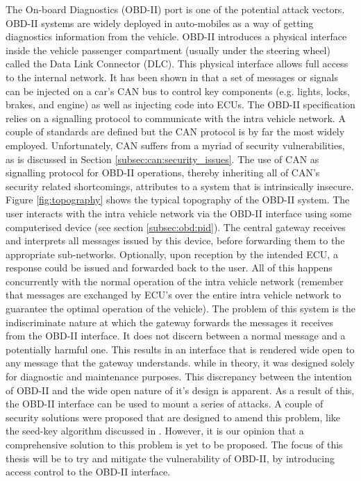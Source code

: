 The On-board Diagnostics (OBD-II) port is one of the potential attack vectors.  OBD-II systems are widely deployed in auto-mobiles as a way of getting diagnostics information from the vehicle. OBD-II introduces a physical interface inside the vehicle passenger compartment (usually under the steering wheel) called the Data Link Connector (DLC). This physical interface allows full access to the internal network. It has been shown in \cite{MillerA,Yadav16,MillerB,MillerC} that a set of messages or signals can be injected on a car's CAN bus to control key components (e.g. lights, locks, brakes, and engine) as well as injecting code into ECUs. The OBD-II specification relies on a signalling protocol to communicate with the intra vehicle network. A couple of standards are defined but the CAN protocol is by far the most widely employed. Unfortunately, CAN suffers from a myriad of security vulnerabilities, as is discussed in Section \ref{subsec:can:security_issues}. The use of CAN as signalling protocol for OBD-II operations, thereby inheriting all of CAN's security related shortcomings, attributes to a system that is intrinsically insecure. Figure \ref{fig:topography} shows the typical topography of the OBD-II system. The user interacts with the intra vehicle network via the OBD-II interface using some computerised device (see section \ref{subsec:obd:pid}). The central gateway receives and interprets all messages issued by this device, before forwarding them to the appropriate sub-networks. Optionally, upon reception by the intended ECU, a response could be issued and forwarded back to the user. All of this happens concurrently with the normal operation of the intra vehicle network (remember that messages are exchanged by ECU's over the entire intra vehicle network to guarantee the optimal operation of the vehicle). The problem of this system is the indiscriminate nature at which the gateway forwards the messages it receives from the OBD-II interface. It does not discern between a normal message and a potentially harmful one. This results in an interface that is rendered wide open to any message that the gateway understands. while in theory, it was designed solely for diagnostic and maintenance purposes. This discrepancy between the intention of OBD-II and the wide open nature of it's design is apparent. As a result of this, the OBD-II interface can be used to mount a series of attacks. A couple of security solutions were proposed that are designed to amend this problem, like the seed-key algorithm discussed in \cite{Yadav16}. However, it is our opinion that a comprehensive solution to this problem is yet to be proposed. The focus of this thesis will be to try and mitigate the vulnerability of OBD-II, by introducing access control to the OBD-II interface. 


